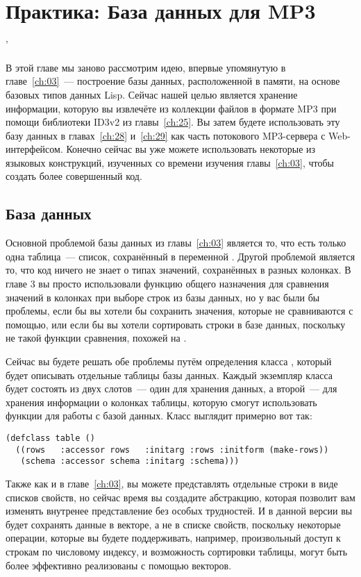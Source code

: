 \chapter{Практика: База данных для MP3}
'\label{ch:27}

В этой главе мы заново рассмотрим идею, впервые упомянутую в главе~\ref{ch:03}~---
построение базы данных, расположенной в памяти, на основе базовых типов данных Lisp.
Сейчас нашей целью является хранение информации, которую вы извлечёте из коллекции файлов
в формате MP3 при помощи библиотеки ID3v2 из главы~\ref{ch:25}.  Вы затем будете
использовать эту базу данных в главах~\ref{ch:28} и~\ref{ch:29} как часть потокового
MP3-сервера с Web-интерфейсом.  Конечно сейчас вы уже можете использовать некоторые из
языковых конструкций, изученных со времени изучения главы~\ref{ch:03}, чтобы создать более
совершенный код.

\section{База данных}

Основной проблемой базы данных из главы~\ref{ch:03} является то, что есть только одна
таблица~--- список, сохранённый в переменной .  Другой проблемой является то,
что код ничего не знает о типах значений, сохранённых в разных колонках.  В главе 3 вы
просто использовали функцию общего назначения  для сравнения значений в
колонках при выборе строк из базы данных, но у вас были бы проблемы, если бы вы хотели бы
сохранить значения, которые не сравниваются с помощью, или если бы вы хотели
сортировать строки в базе данных, поскольку не такой функции сравнения, похожей на
.

Сейчас вы будете решать обе проблемы путём определения класса , который будет
описывать отдельные таблицы базы данных.  Каждый экземпляр класса  будет
состоять из двух слотов~--- один для хранения данных, а второй~--- для хранения информации о
колонках таблицы, которую смогут использовать функции для работы с базой данных.  Класс
выглядит примерно вот так:

\begin{lstlisting}
(defclass table ()
  ((rows   :accessor rows   :initarg :rows :initform (make-rows))
   (schema :accessor schema :initarg :schema)))
\end{lstlisting}

Также как и в главе~\ref{ch:03}, вы можете представлять отдельные строки в виде списков
свойств, но сейчас время вы создадите абстракцию, которая позволит вам изменять внутренее
представление без особых трудностей. И в данной версии вы будет сохранять данные в
векторе, а не в списке свойств, поскольку некоторые операции, которые вы будете
поддерживать, например, произвольный доступ к строкам по числовому индексу, и возможность
сортировки таблицы, могут быть более эффективно реализованы с помощью векторов.

